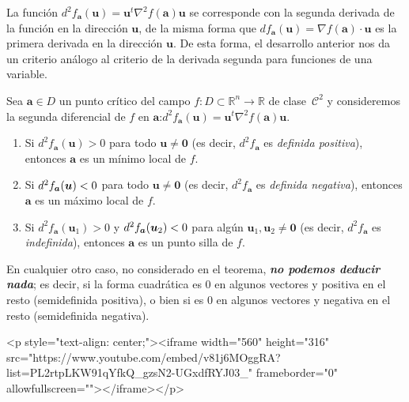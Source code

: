 La función $d^2f_{\boldsymbol a}(\boldsymbol u) = \boldsymbol u^t\nabla^2f(\boldsymbol a)\boldsymbol u$ se corresponde con la segunda derivada de la función en la dirección $\boldsymbol u$, de la misma forma que $df_{\boldsymbol a}(\boldsymbol u)=\nabla f(\boldsymbol a)\cdot\boldsymbol u$ es la primera derivada en la dirección $\boldsymbol u$.
De esta forma, el desarrollo anterior nos da un criterio análogo al criterio de la derivada segunda para funciones de una variable.
%
\begin{teorema}
Sea $\boldsymbol{a}\in \mathit{D}$ un punto crítico del campo $f\colon \mathit{D}\subset\mathbb{R}^n\to\mathbb{R}$ de clase~$\mathcal C^2$ y consideremos la segunda diferencial de $f$ en $\boldsymbol a$:\quad $d^2f_{\boldsymbol a}(\boldsymbol u) = \boldsymbol u^t\nabla^2f(\boldsymbol a)\boldsymbol u$.
\begin{enumerate}
\item
Si $d^2f_{\boldsymbol a}(\boldsymbol{u})>0$ para todo $\boldsymbol{u}\neq \boldsymbol{0}$ (es decir, $d^2f_{\boldsymbol a}$ es \emph{definida positiva}), entonces $\boldsymbol{a}$ es un mínimo local
de $f$.
\item
Si $d^2f_{\boldsymbol a}(\boldsymbol{u})< 0$ para todo $\boldsymbol{u}\neq \boldsymbol 0$
(es decir, $d^2f_{\boldsymbol a}$ es \emph{definida negativa}), entonces $\boldsymbol{a}$ es un máximo local
de $f$.
\item
Si $d^2f_{\boldsymbol a}(\boldsymbol{u}_1)>0$ y $d^2f_{\boldsymbol a}(\boldsymbol{u}_2)< 0$ para algún $\boldsymbol{u}_1,\boldsymbol{u}_2\neq \boldsymbol{0}$ (es decir, $d^2f_{\boldsymbol a}$ es \emph{indefinida}),
entonces $\boldsymbol{a}$ es un punto silla de $f$.
\end{enumerate}
\end{teorema}
%
En cualquier otro caso, no considerado en el teorema, \textbf{\emph{no podemos deducir nada}}; es decir, si la forma cuadrática es 0 en algunos vectores y positiva en el resto (semidefinida positiva), o bien si es 0 en algunos vectores y negativa en el resto (semidefinida negativa).

\begin{rawhtml}
<p style="text-align: center;"><iframe width="560" height="316" src="https://www.youtube.com/embed/v81j6MOggRA?list=PL2rtpLKW91qYfkQ_gzsN2-UGxdfRYJ03_" frameborder="0" allowfullscreen=""></iframe></p>
\end{rawhtml}


